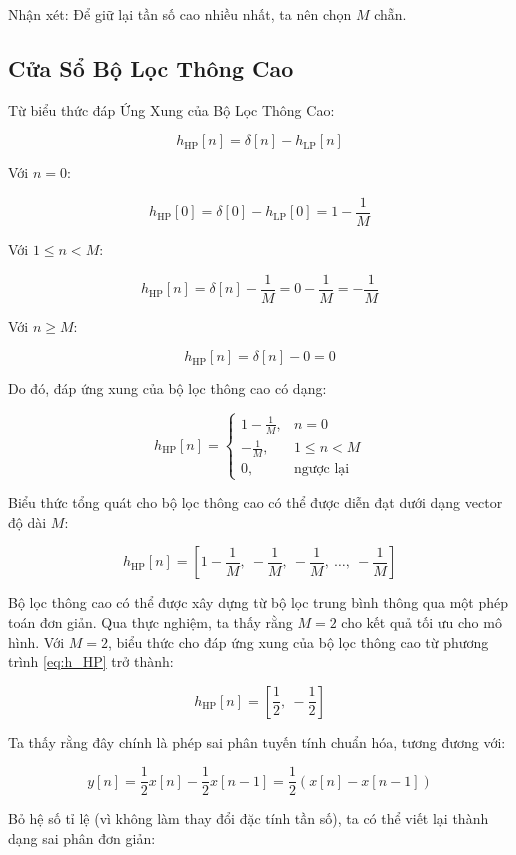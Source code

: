 Nhận xét: Để giữ lại tần số cao nhiều nhất, ta nên chọn \( M \) chẵn.

\subsection*{Cửa Sổ Bộ Lọc Thông Cao}
\label{sec:cua_so_loc_thong_cao}

Từ biểu thức đáp Ứng Xung của Bộ Lọc Thông Cao:

\[
h_{\mathrm{HP}}[n] = \delta[n] - h_{\mathrm{LP}}[n]
\]

Với \( n = 0 \):

\[
h_{\mathrm{HP}}[0] = \delta[0] - h_{\mathrm{LP}}[0] = 1 - \frac{1}{M}
\]

Với \( 1 \leq n < M \):

\[
h_{\mathrm{HP}}[n] = \delta[n] - \frac{1}{M} = 0 - \frac{1}{M} = -\frac{1}{M}
\]

Với \( n \geq M \):

\[
h_{\mathrm{HP}}[n] = \delta[n] - 0 = 0
\]

Do đó, đáp ứng xung của bộ lọc thông cao có dạng:

\[
h_{\mathrm{HP}}[n] =
\begin{cases}
	1 - \frac{1}{M}, & n = 0 \\
	-\frac{1}{M}, & 1 \leq n < M \\
	0, & \text{ngược lại}
\end{cases}
\]

Biểu thức tổng quát cho bộ lọc thông cao có thể được diễn đạt dưới dạng vector độ dài \( M \):

\begin{equation}
	\label{eq:h_HP}
	h_{\mathrm{HP}}[n] = \left[ 1 - \frac{1}{M},\ -\frac{1}{M},\ -\frac{1}{M},\ \ldots,\ -\frac{1}{M} \right]
\end{equation}
%

Bộ lọc thông cao có thể được xây dựng từ bộ lọc trung bình thông qua một phép toán đơn giản. Qua thực nghiệm, ta thấy rằng \( M = 2 \) cho kết quả tối ưu cho mô hình.
%
Với \( M = 2 \), biểu thức cho đáp ứng xung của bộ lọc thông cao từ phương trình \eqref{eq:h_HP} trở thành:

\[
h_{\mathrm{HP}}[n] = \left[ \frac{1}{2},\ -\frac{1}{2} \right]
\]

Ta thấy rằng đây chính là {phép sai phân tuyến tính chuẩn hóa}, tương đương với:

\[
y[n] = \frac{1}{2}x[n] - \frac{1}{2}x[n-1] = \frac{1}{2}(x[n] - x[n-1])
\]

Bỏ hệ số tỉ lệ (vì không làm thay đổi đặc tính tần số), ta có thể viết lại thành dạng sai phân đơn giản:

